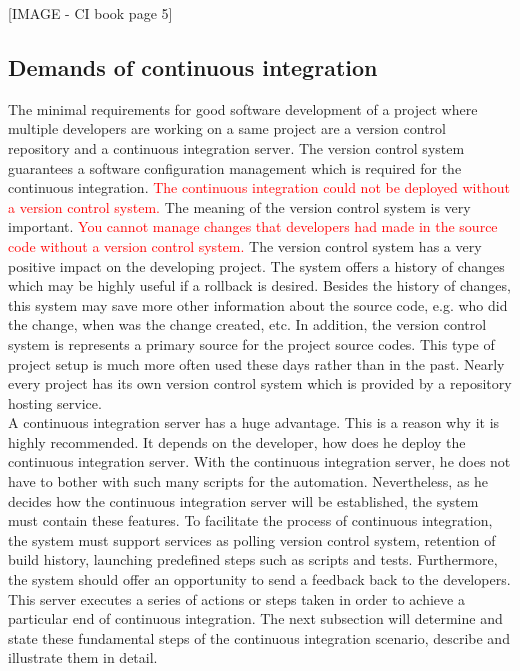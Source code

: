 [IMAGE - CI book page 5]

\subsection{Demands of continuous integration}
The minimal requirements for good software development of a project where multiple developers are working on a same project are a version control repository and a continuous integration server. The version control system guarantees a software configuration management which is required for the continuous integration. \textcolor{red}{The continuous integration could not be deployed without a version control system.} The meaning of the version control system is very important. \textcolor{red}{You cannot manage changes that developers had made in the source code without a version control system.} The version control system has a very positive impact on the developing project. The system offers a history of changes which may be highly useful if a rollback is desired. Besides the history of changes, this system may save more other information about the source code, e.g. who did the change, when was the change created, etc. In addition, the version control system is represents a primary source for the project source codes. This type of project setup is much more often used these days rather than in the past. Nearly every project has its own version control system which is provided by a repository hosting service.\\

A continuous integration server has a huge advantage. This is a reason why it is highly recommended. It depends on the developer, how does he deploy the continuous integration server. With the continuous integration server, he does not have to bother with such many scripts for the automation. Nevertheless, as he decides how the continuous integration server will be established, the system must contain these features. To facilitate the process of continuous integration, the system must support services as polling version control system, retention of build history, launching predefined steps such as scripts and tests. Furthermore, the system should offer an opportunity to send a feedback back to the developers. This server executes a series of actions or steps taken in order to achieve a particular end of continuous integration. The next subsection will determine and state these fundamental steps of the continuous integration scenario, describe and illustrate them in detail.

